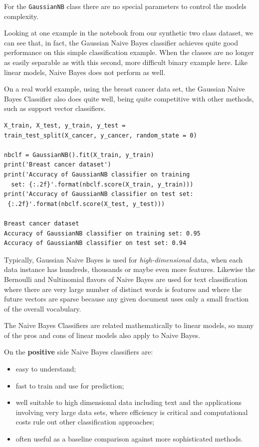 \begin{multicols}{2}
For the \texttt{GaussianNB} class there are no special parameters to control the models complexity. 

Looking at one example in the notebook from our synthetic two class dataset, we can see that, in fact, the Gaussian Naive Bayes classifier achieves quite good performance on this simple classification example. When the classes are no longer as easily separable as with this second, more difficult binary example here. Like linear models, Naive Bayes does not perform as well. 

On a real world example, using the breast cancer data set, the Gaussian Naive Bayes Classifier also does quite well, being quite competitive with other methods, such as support vector classifiers. 

{\scriptsize
\begin{verbatim}
X_train, X_test, y_train, y_test = 
train_test_split(X_cancer, y_cancer, random_state = 0)

nbclf = GaussianNB().fit(X_train, y_train)
print('Breast cancer dataset')
print('Accuracy of GaussianNB classifier on training 
  set: {:.2f}'.format(nbclf.score(X_train, y_train)))
print('Accuracy of GaussianNB classifier on test set:
 {:.2f}'.format(nbclf.score(X_test, y_test)))

Breast cancer dataset
Accuracy of GaussianNB classifier on training set: 0.95
Accuracy of GaussianNB classifier on test set: 0.94
\end{verbatim}
}

Typically, Gaussian Naive Bayes is used for \emph{high-dimensional} data, when each data instance has hundreds, thousands or maybe even more features. Likewise the Bernoulli and Nultinomial flavors of Naive Bayes are used for text classification where there are very large number of distinct words is features and where the future vectors are sparse because any given document uses only a small fraction of the overall vocabulary. 

The Naive Bayes Classifiers are related mathematically to linear models, so many of the pros and cons of linear models also apply to Naive Bayes. 

On the \textbf{positive} side Naive Bayes classifiers are:
\begin{itemize}
\item easy to understand;
\item fast to train and use for prediction;
\item well suitable to high dimensional data including text and the applications involving very large data sets, where efficiency is critical and computational costs rule out other classification approaches;
\item often useful as a baseline comparison against more sophisticated methods.
\end{itemize}



\end{multicols}
